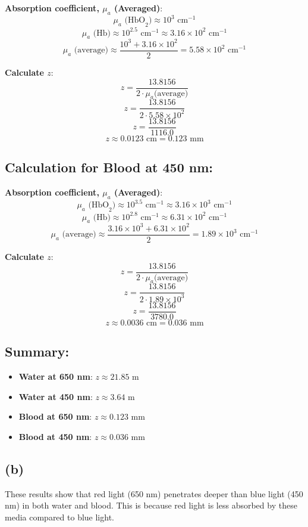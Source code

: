 \documentclass[12pt]{article}
\begin{document}
\textbf{Absorption coefficient, \( \mu_a\) (Averaged)}:
\[ \mu_a \text{ (HbO}_2) \approx 10^3 \text{ cm}^{-1} \]
\[ \mu_a \text{ (Hb)} \approx 10^2.5 \text{ cm}^{-1} \approx 3.16 \times 10^2 \text{ cm}^{-1} \]
\[ \mu_a \text{ (average)} \approx \frac{10^3 + 3.16 \times 10^2}{2} = 5.58 \times 10^2 \text{ cm}^{-1} \]

\textbf{Calculate \( z \)}:
\[ z = \frac{13.8156}{2 \cdot \mu_a \text{(average)}} \]
\[ z = \frac{13.8156}{2 \cdot 5.58 \times 10^2} \]
\[ z = \frac{13.8156}{1116.0} \]
\[ z \approx 0.0123 \text{ cm} = 0.123 \text{ mm} \]

\subsection*{Calculation for Blood at 450 nm:}

\textbf{Absorption coefficient, \( \mu_a\) (Averaged)}:
\[ \mu_a \text{ (HbO}_2) \approx 10^3.5 \text{ cm}^{-1} \approx 3.16 \times 10^3 \text{ cm}^{-1} \]
\[ \mu_a \text{ (Hb)} \approx 10^2.8 \text{ cm}^{-1} \approx 6.31 \times 10^2 \text{ cm}^{-1} \]
\[ \mu_a \text{ (average)} \approx \frac{3.16 \times 10^3 + 6.31 \times 10^2}{2} = 1.89 \times 10^3 \text{ cm}^{-1} \]



\textbf{Calculate \( z \)}:
\[ z = \frac{13.8156}{2 \cdot \mu_a \text{(average)}} \]
\[ z = \frac{13.8156}{2 \cdot 1.89 \times 10^3} \]
\[ z = \frac{13.8156}{3780.0} \]
\[ z \approx 0.0036 \text{ cm} = 0.036 \text{ mm} \]

\subsection*{Summary:}
\begin{itemize}
    \item \textbf{Water at 650 nm}: \( z \approx 21.85 \text{ m} \)
    \item \textbf{Water at 450 nm}: \( z \approx 3.64 \text{ m} \)
    \item \textbf{Blood at 650 nm}: \( z \approx 0.123 \text{ mm} \)
    \item \textbf{Blood at 450 nm}: \( z \approx 0.036 \text{ mm} \)
\end{itemize}

\subsection*{(b)}
These results show that red light (650 nm) penetrates deeper than blue light (450 nm) in both water and blood. This is because red light is less absorbed by these media compared to blue light.
\end{document}
